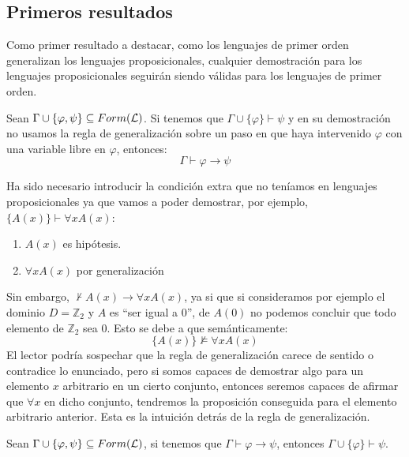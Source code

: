 \subsection{Primeros resultados}
Como primer resultado a destacar, como los lenguajes de primer orden generalizan los lenguajes proposicionales, cualquier demostración para los lenguajes proposicionales seguirán siendo válidas para los lenguajes de primer orden.

\begin{teo}[de la Deducción]
    Sean $\Gamma\cup\{\varphi,\psi\}\subseteq Form(\mathcal{L})$. Si tenemos que $\Gamma\cup\{\varphi\}\vdash  \psi$ y en su demostración no usamos la regla de generalización sobre un paso en que haya intervenido $\varphi$ con una variable libre en $\varphi$, entonces:
    \begin{equation*}
        \Gamma\vdash \varphi\to\psi
    \end{equation*}
\end{teo}

\begin{observacion}
    Ha sido necesario introducir la condición extra que no teníamos en lenguajes proposicionales ya que vamos a poder demostrar, por ejemplo, ${\{A(x)\}\vdash \forall xA(x)}$:
    \begin{enumerate}
        \item $A(x)$ es hipótesis.
        \item $\forall xA(x)$ por generalización
    \end{enumerate}
    Sin embargo, $\nvdash A(x)\to \forall xA(x)$, ya si que si consideramos por ejemplo el dominio $D=\mathbb{Z}_2$ y $A$ es ``ser igual a 0'', de $A(0)$ no podemos concluir que todo elemento de $\mathbb{Z}_2$ sea $0$. Esto se debe a que semánticamente:
    \begin{equation*}
        \{A(x)\} \nvDash \forall xA(x)
    \end{equation*}
    El lector podría sospechar que la regla de generalización carece de sentido o contradice lo enunciado, pero si somos capaces de demostrar algo para un elemento $x$ arbitrario en un cierto conjunto, entonces seremos capaces de afirmar que $\forall x$ en dicho conjunto, tendremos la proposición conseguida para el elemento arbitrario anterior. Esta es la intuición detrás de la regla de generalización.
\end{observacion}

\begin{prop}
    Sean $\Gamma\cup\{\varphi,\psi\}\subseteq Form(\mathcal{L})$, si tenemos que $\Gamma\vdash \varphi\to\psi$, entonces $\Gamma\cup\{\varphi\}\vdash \psi$.
\end{prop}

